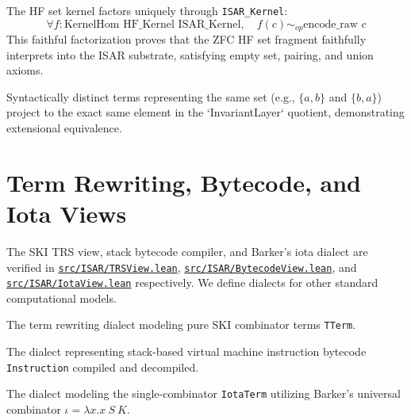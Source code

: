 \begin{theorem}
The HF set kernel factors uniquely through \texttt{ISAR\_Kernel}:
$$\forall f : \text{KernelHom HF\_Kernel ISAR\_Kernel}, \quad f(c) \sim_{op} \text{encode\_raw } c$$
This faithful factorization proves that the ZFC HF set fragment faithfully interprets into the ISAR substrate, satisfying empty set, pairing, and union axioms.

Syntactically distinct terms representing the same set (e.g., $\{a, b\}$ and $\{b, a\}$) project to the exact same element in the `InvariantLayer` quotient, demonstrating extensional equivalence.
\end{theorem}

\section{Term Rewriting, Bytecode, and Iota Views}

The SKI TRS view, stack bytecode compiler, and Barker's iota dialect are verified in \href{https://github.com/cypoe/isar-proofs/blob/master/src/ISAR/TRSView.lean}{\texttt{src/ISAR/TRSView.lean}}, \href{https://github.com/cypoe/isar-proofs/blob/master/src/ISAR/BytecodeView.lean}{\texttt{src/ISAR/BytecodeView.lean}}, and \href{https://github.com/cypoe/isar-proofs/blob/master/src/ISAR/IotaView.lean}{\texttt{src/ISAR/IotaView.lean}} respectively. We define dialects for other standard computational models.

\begin{definition}
The term rewriting dialect modeling pure SKI combinator terms \texttt{TTerm}.
\end{definition}

\begin{definition}
The dialect representing stack-based virtual machine instruction bytecode \texttt{Instruction} compiled and decompiled.
\end{definition}

\begin{definition}
The dialect modeling the single-combinator \texttt{IotaTerm} utilizing Barker's universal combinator $\iota = \lambda x. x\ S\ K$.
\end{definition}

